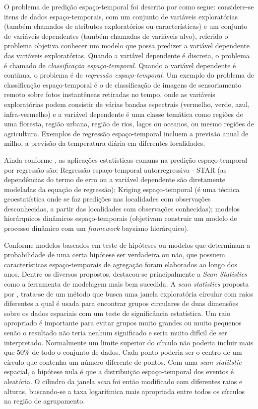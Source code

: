O problema de predição espaço-temporal foi descrito por  como segue: considere-se itens de dados espaço-temporais, com um conjunto de variáveis exploratórias (também chamados de atributos exploratórios ou características) e um conjunto de variáveis dependentes (também chamadas de variáveis alvo), referido o problema objetiva conhecer um modelo que possa predizer a variável dependente das variáveis exploratórias. Quando a variável dependente é discreta, o problema é chamado de \emph{classificação espaço-temporal}. Quando a variável dependente é contínua, o problema é de \emph{regressão espaço-temporal}. Um exemplo do problema de classificação espaço-temporal é o de classificação de imagens de sensoriamento remoto sobre fotos instantêneas retiradas no tempo, onde 
as variáveis exploratórias podem consistir de várias bandas espectrais (vermelho, verde, azul, infra-vermelho) e a variável dependente é uma classe temática como regiões de uma floresta, região urbana, região de rios, lagos ou oceanos, ou mesmo regiões de agricultura. Exemplos de regressão espaço-temporal incluem a previsão anual de milho, a previsão da temperatura diária em diferentes localidades.

Ainda conforme , as aplicações  estatísticas comuns  na predição espaço-temporal por regressão são: Regressão espaço-temporal autorregressiva - \acrshort{STAR} (as dependências do termo de erro ou a variável dependente são diretamente modeladas da equação de regressão); Kriging espaço-temporal (é uma técnica geoestatística onde se faz predições nas localidades com observações desconhecidas, a partir das localidades com observações conhecidas); modelos hierárquicos dinâmicos espaço-temporais (objetivam construir um modelo de processo dinâmico com um \emph{framework} baysiano hierárquico).

Conforme  modelos baseados em teste de hipóteses ou modelos que determinam a probabilidade de uma certa hipótese ser verdadeira ou não, que possuem características espaço-temporais de agregação foram elaborados ao longo dos anos. Dentre os diversos propostos, destacou-se principalmente a \emph{Scan Statistics} como a ferramenta de modelagem mais bem sucedida. A \emph{scan statistics} proposta por , trata-se de um método que busca uma janela exploratória circular com raios diferentes a qual é usada para encontrar grupos circulares de duas dimensões sobre os dados espaciais com um teste de significância estatística. Um raio apropriado é importante para evitar grupos muito grandes ou muito pequenos senão o resultado não teria nenhum significado e seria muito difícil de ser interpretado. Normalmente um limite superior do círculo não poderia incluir mais que 50\% de todo o conjunto de dados. Cada ponto poderia ser o centro de um círculo que contenha um número diferente de pontos. Com uma \emph{scan statitstic} espacial, a hipótese nula é que a distribuição espaço-temporal dos eventos é aleatória. O cilindro da janela \emph{scan} foi então modificado com diferentes raios e alturas, buscando-se a  taxa logarítmica mais apropriada entre todos os círculos na região de agrupamento.

